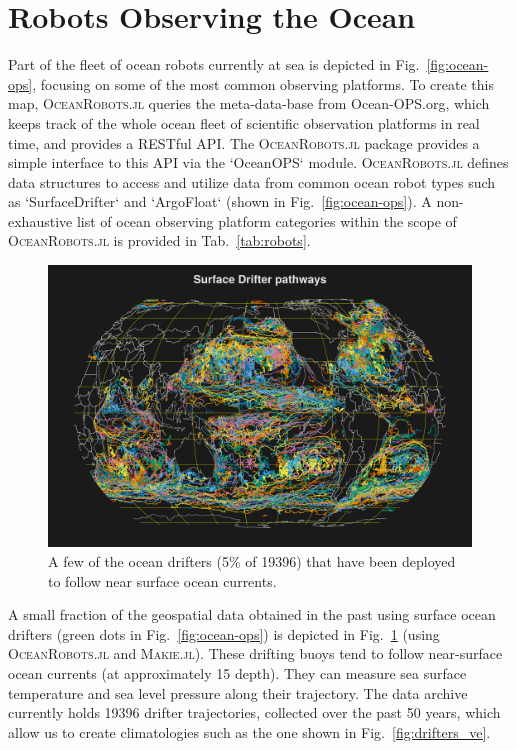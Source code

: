 \documentclass{juliacon}[12pt]
\newcommand{\pkg}[1]{{\small \textsc{#1}}}
\begin{document}
\section{Robots Observing the Ocean}

Part of the fleet of ocean robots currently at sea is depicted in Fig.~\ref{fig:ocean-ops}, focusing on some of the most common observing platforms. To create this map, \pkg{OceanRobots.jl} queries the meta-data-base from Ocean-OPS.org, which keeps track of the whole ocean fleet of scientific observation platforms in real time, and provides a RESTful API. The \pkg{OceanRobots.jl} package provides a simple interface to this API via the `OceanOPS` module. \pkg{OceanRobots.jl} defines data structures to access and utilize data from common ocean robot types such as  `SurfaceDrifter` and `ArgoFloat` (shown in Fig.~\ref{fig:ocean-ops}). A non-exhaustive list of ocean observing platform categories within the scope of \pkg{OceanRobots.jl} is provided in Tab.~\ref{tab:robots}.

\begin{figure}[t]
\centerline{\includegraphics[width=\columnwidth]{figs/20240528_drifters_5percent.png}}
\caption{A few of the ocean drifters (5\% of 19396) that have been deployed to follow near surface ocean currents.}
\label{fig:drifters}
\end{figure}

A small fraction of the geospatial data obtained in the past using surface ocean drifters (green dots in Fig.~\ref{fig:ocean-ops}) is depicted in Fig.~\ref{fig:drifters} (using \pkg{OceanRobots.jl} and \pkg{Makie.jl}). These drifting buoys tend to follow near-surface ocean currents (at approximately 15 depth). They can measure sea surface temperature and sea level pressure along their trajectory. The data archive currently holds 19396 drifter trajectories, collected over the past 50 years, which allow us to create climatologies such as the one shown in Fig.~\ref{fig:drifters_ve}.
\end{document}
